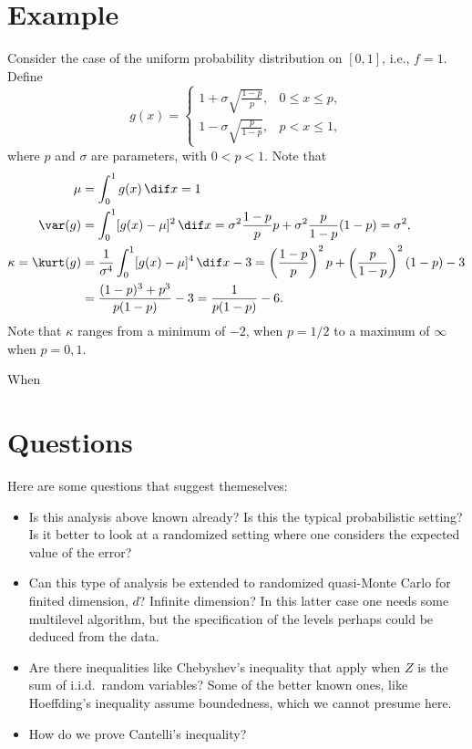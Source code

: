 \documentclass[12pt]{amsart}
\begin{document}
\section{Example}

Consider the case of the uniform probability distribution on $[0,1]$, i.e., $f=1$.  Define
\[
g(x) = \begin{cases} 1 + \sigma \sqrt{\frac{1-p}{p}}, & 0 \le x \le p,\\
1 - \sigma \sqrt{\frac{p}{1-p}}, & p < x \le 1,
\end{cases}
\]
where $p$ and $\sigma$ are parameters, with $0 < p < 1$.
Note that
\begin{align*}
\mu &= \int_0^1 g(x) \, \dif x = 1\\
\var(g) &= \int_0^1 [g(x)-\mu]^2 \, \dif x = \sigma^2 \frac{1-p}{p} p + \sigma^2 \frac{p}{1-p} (1-p) = \sigma^2, \\
\kappa = \kurt(g) &= \frac{1}{\sigma^4}\int_0^1 [g(x)-\mu]^4 \, \dif x - 3 = \left(\frac{1-p}{p}\right)^2 p + \left(\frac{p}{1-p} \right)^2 (1-p) - 3 \\
& = \frac{(1-p)^3 + p^3}{p(1-p)} - 3 = \frac{1}{p(1-p)} - 6.
\end{align*}
Note that $\kappa$ ranges from a minimum of $-2$, when $p=1/2$ to a maximum of $\infty$ when $p=0,1$.

When

\section{Questions}

Here are some questions that suggest themeselves:

\begin{itemize}

\item Is this analysis above known already?  Is this the typical probabilistic setting?  Is it better to look at a randomized setting where one considers the expected value of the error?

\item Can this type of analysis be extended to randomized quasi-Monte Carlo for finited dimension, $d$?  Infinite dimension?  In this latter case one needs some multilevel algorithm, but the specification of the levels perhaps could be deduced from the data.

\item Are there inequalities like Chebyshev's inequality that apply when $Z$ is the sum of i.i.d.\ random variables?  Some of the better known ones, like Hoeffding's inequality assume boundedness, which we cannot presume here.

\item How do we prove Cantelli's inequality?

\end{itemize}
\end{document}
